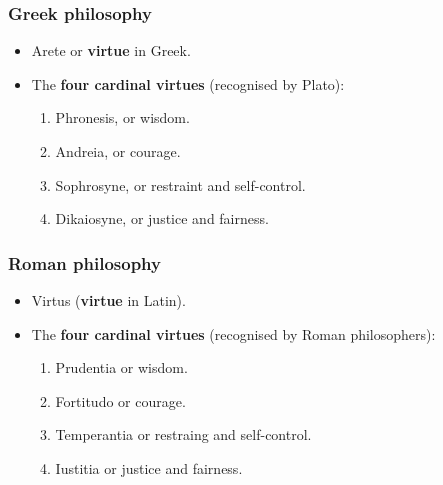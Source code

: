\documentclass[11pt]{article}
\begin{document}
\subsubsection{Greek philosophy}
\label{sec:org889cdbf}
\begin{itemize}
\item Arete or \textbf{virtue} in Greek.
\item The \textbf{four cardinal virtues} (recognised by Plato):
\begin{enumerate}
\item Phronesis, or wisdom.
\item Andreia, or courage.
\item Sophrosyne, or restraint and self-control.
\item Dikaiosyne, or justice and fairness.
\end{enumerate}
\end{itemize}
\subsubsection{Roman philosophy}
\label{sec:org9ade175}
\begin{itemize}
\item Virtus (\textbf{virtue} in Latin).
\item The \textbf{four cardinal virtues} (recognised by Roman philosophers):
\begin{enumerate}
\item Prudentia or wisdom.
\item Fortitudo or courage.
\item Temperantia or restraing and self-control.
\item Iustitia or justice and fairness.
\end{enumerate}
\end{itemize}
\end{document}

